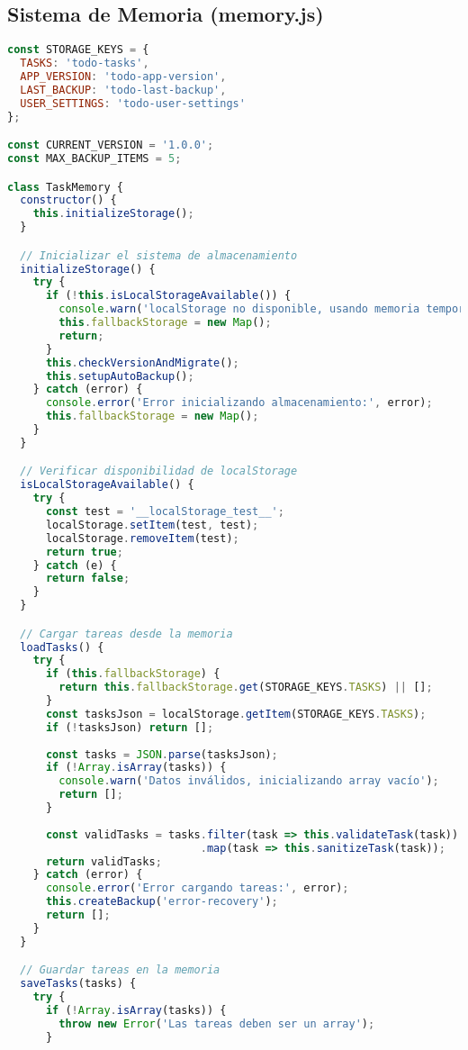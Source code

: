 \documentclass[12pt,a4paper]{article}
\begin{document}
\subsection{Sistema de Memoria (memory.js)}
\begin{lstlisting}[language=JavaScript,caption={Sistema robusto de gestión de memoria}]
const STORAGE_KEYS = {
  TASKS: 'todo-tasks',
  APP_VERSION: 'todo-app-version',
  LAST_BACKUP: 'todo-last-backup',
  USER_SETTINGS: 'todo-user-settings'
};

const CURRENT_VERSION = '1.0.0';
const MAX_BACKUP_ITEMS = 5;

class TaskMemory {
  constructor() {
    this.initializeStorage();
  }

  // Inicializar el sistema de almacenamiento
  initializeStorage() {
    try {
      if (!this.isLocalStorageAvailable()) {
        console.warn('localStorage no disponible, usando memoria temporal');
        this.fallbackStorage = new Map();
        return;
      }
      this.checkVersionAndMigrate();
      this.setupAutoBackup();
    } catch (error) {
      console.error('Error inicializando almacenamiento:', error);
      this.fallbackStorage = new Map();
    }
  }

  // Verificar disponibilidad de localStorage
  isLocalStorageAvailable() {
    try {
      const test = '__localStorage_test__';
      localStorage.setItem(test, test);
      localStorage.removeItem(test);
      return true;
    } catch (e) {
      return false;
    }
  }

  // Cargar tareas desde la memoria
  loadTasks() {
    try {
      if (this.fallbackStorage) {
        return this.fallbackStorage.get(STORAGE_KEYS.TASKS) || [];
      }
      const tasksJson = localStorage.getItem(STORAGE_KEYS.TASKS);
      if (!tasksJson) return [];
      
      const tasks = JSON.parse(tasksJson);
      if (!Array.isArray(tasks)) {
        console.warn('Datos inválidos, inicializando array vacío');
        return [];
      }
      
      const validTasks = tasks.filter(task => this.validateTask(task))
                              .map(task => this.sanitizeTask(task));
      return validTasks;
    } catch (error) {
      console.error('Error cargando tareas:', error);
      this.createBackup('error-recovery');
      return [];
    }
  }

  // Guardar tareas en la memoria
  saveTasks(tasks) {
    try {
      if (!Array.isArray(tasks)) {
        throw new Error('Las tareas deben ser un array');
      }
      

\end{lstlisting}
\end{document}
